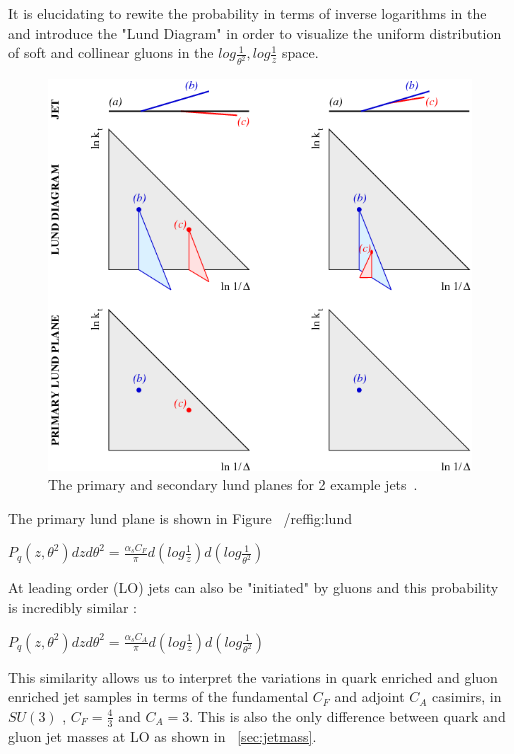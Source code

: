 It is elucidating to rewite the probability in terms of inverse logarithms in the and introduce the "Lund Diagram" in order to visualize the uniform distribution of soft and collinear gluons in the $log \frac{1}{ \theta^2} , log\frac{1}{z} $ space.

\begin{figure}[htb]
\label{fig:lund}
\centering
\includegraphics[width=1.0\textwidth]{visuals/figs_lund.png}
\caption{The primary and secondary lund planes for 2 example jets~\cite{Dreyer:2018nbf}.}

\end{figure}


The primary lund plane is shown in Figure ~/ref{fig:lund} ~\cite{Dreyer:2018nbf}



$P_q(z,\theta^2) dz d \theta^2 = \frac{\alpha_s C_F}{\pi} d( log\frac{1}{z}  ) d(log \frac{1}{ \theta^2})  $\newline

At leading order (LO) jets can also be "initiated" by gluons and this probability is incredibly similar :


$P_q(z,\theta^2) dz d \theta^2 = \frac{\alpha_s C_A}{\pi} d( log\frac{1}{z}  ) d(log \frac{1}{ \theta^2})  $\newline


This similarity allows us to interpret the variations in quark enriched and gluon enriched jet samples in terms of the fundamental $C_F$ and adjoint $C_A$ casimirs, in $SU(3)$ ,   $C_F = \frac{4}{3}$ and $C_A=3$. This is also the only difference between quark and gluon jet masses at LO as shown in ~\ref{sec:jetmass}.


